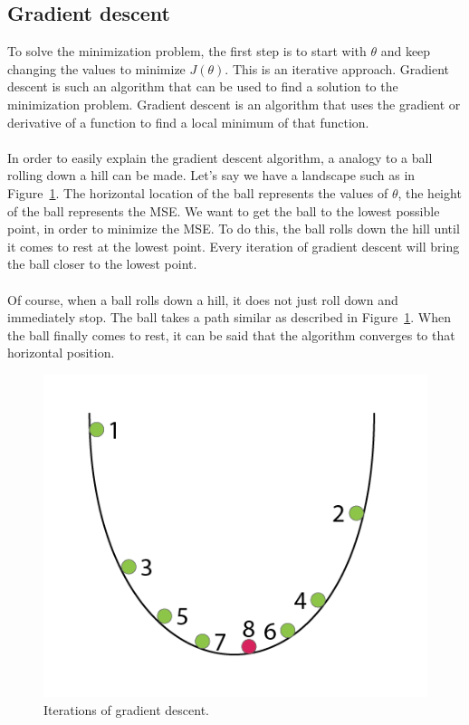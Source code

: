 \subsection{Gradient descent}
To solve the minimization problem, the first step is to start with $\theta$ and keep changing the values to minimize $J(\theta)$. This is an iterative approach.  Gradient descent is such an algorithm that can be used to find a solution to the minimization problem. Gradient descent is an algorithm that uses the gradient or derivative of a function to find a local minimum of that function. \\\\
In order to easily explain the gradient descent algorithm, a analogy to a ball rolling down a hill can be made. \cite{rollingBall} Let's say we have a landscape such as in Figure~\ref{fig:gradient}. The horizontal location of the ball represents the values of $\theta$, the height of the ball represents the MSE. We want to get the ball to the lowest possible point, in order to minimize the MSE. To do this, the ball rolls down the hill until it comes to rest at the lowest point. Every iteration of gradient descent will bring the ball closer to the lowest point. \\\\
Of course, when a ball rolls down a hill, it does not just roll down and immediately stop. The ball takes a path similar as described in Figure~\ref{fig:gradient}. When the ball finally comes to rest, it can be said that the algorithm converges to that horizontal position.
 \begin{figure}[H]
\centering
\includegraphics[width=1\textwidth]{Figures/gradient}
\decoRule
\caption[Gradient descent]{Iterations of gradient descent. \cite{gradient-fig}}
\label{fig:gradient}
\end{figure}
